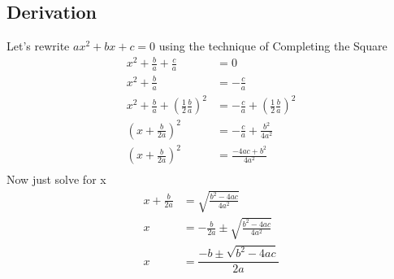 \subsection{Derivation}

Let's rewrite \(ax^2+bx+c = 0 \) using the technique of Completing the Square \\
\begin{align*}
x^2 + \frac{b}{a} + \frac{c}{a} &= 0 \\
x^2 + \frac{b}{a} &= -\frac{c}{a} \\
x^2 + \frac{b}{a} + \left(\frac{1}{2}\frac{b}{a}\right)^2 &= -\frac{c}{a} + \left(\frac{1}{2}\frac{b}{a}\right)^2 \\
\left(x + \frac{b}{2a}\right)^2 &= -\frac{c}{a} + \frac{b^2}{4a^2} \\
\left(x + \frac{b}{2a}\right)^2 &= \frac{-4ac +b^2}{4a^2} \\
\end{align*}
Now just solve for x
\begin{align*}
x + \frac{b}{2a} &= \sqrt{\frac{b^2 -4ac}{4a^2}} \\
x  &= -\frac{b}{2a} \pm \sqrt{\frac{b^2 -4ac}{4a^2}}  \\
x &= \dfrac{-b \pm \sqrt{b^2 -4ac}}{2a}
\end{align*}
